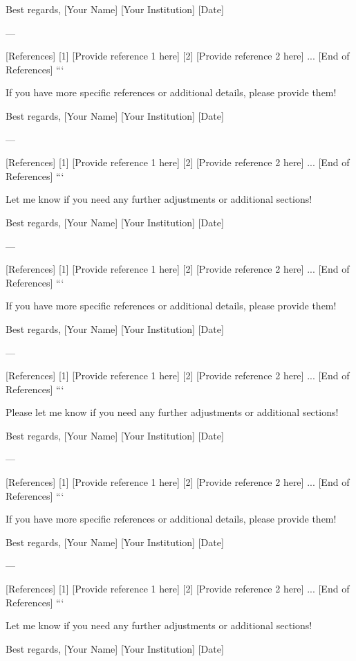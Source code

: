 Best regards,  
[Your Name]  
[Your Institution]  
[Date]  

--- 

[References]  
[1] [Provide reference 1 here]  
[2] [Provide reference 2 here]  
...  
[End of References]  
``` 

If you have more specific references or additional details, please provide them! 

Best regards,  
[Your Name]  
[Your Institution]  
[Date]  

--- 

[References]  
[1] [Provide reference 1 here]  
[2] [Provide reference 2 here]  
...  
[End of References]  
``` 

Let me know if you need any further adjustments or additional sections! 

Best regards,  
[Your Name]  
[Your Institution]  
[Date]  

--- 

[References]  
[1] [Provide reference 1 here]  
[2] [Provide reference 2 here]  
...  
[End of References]  
``` 

If you have more specific references or additional details, please provide them! 

Best regards,  
[Your Name]  
[Your Institution]  
[Date]  

--- 

[References]  
[1] [Provide reference 1 here]  
[2] [Provide reference 2 here]  
...  
[End of References]  
``` 

Please let me know if you need any further adjustments or additional sections! 

Best regards,  
[Your Name]  
[Your Institution]  
[Date]  

--- 

[References]  
[1] [Provide reference 1 here]  
[2] [Provide reference 2 here]  
...  
[End of References]  
``` 

If you have more specific references or additional details, please provide them! 

Best regards,  
[Your Name]  
[Your Institution]  
[Date]  

--- 

[References]  
[1] [Provide reference 1 here]  
[2] [Provide reference 2 here]  
...  
[End of References]  
``` 

Let me know if you need any further adjustments or additional sections! 

Best regards,  
[Your Name]  
[Your Institution]  
[Date]  

